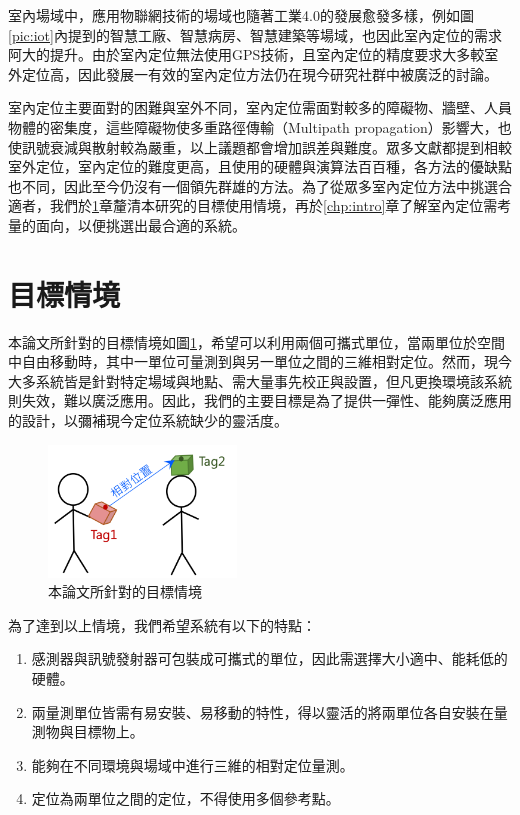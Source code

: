 室內場域中，應用物聯網技術的場域也隨著工業4.0的發展愈發多樣，例如圖\ref{pic:iot}內提到的智慧工廠、智慧病房、智慧建築等場域，也因此室內定位的需求阿大的提升。由於室內定位無法使用GPS技術，且室內定位的精度要求大多較室外定位高，因此發展一有效的室內定位方法仍在現今研究社群中被廣泛的討論\cite{survey_indoor2014}。

室內定位主要面對的困難與室外不同，室內定位需面對較多的障礙物、牆壁、人員物體的密集度，這些障礙物使多重路徑傳輸（Multipath propagation）影響大，也使訊號衰減與散射較為嚴重，以上議題都會增加誤差與難度。眾多文獻都提到相較室外定位，室內定位的難度更高\cite{survey_light2020}\cite{survey_light2018}\cite{survey_indoor2014}\cite{survey_indoor2018}\cite{survey:indoor_wayfinding}，且使用的硬體與演算法百百種，各方法的優缺點也不同，因此至今仍沒有一個領先群雄的方法。為了從眾多室內定位方法中挑選合適者，我們於\ref{chp:motivate}章釐清本研究的目標使用情境，再於\ref{chp:intro}章了解室內定位需考量的面向，以便挑選出最合適的系統。






\section{目標情境}
\label{chp:motivate}

本論文所針對的目標情境如圖\ref{pic:imagine}，希望可以利用兩個可攜式單位，當兩單位於空間中自由移動時，其中一單位可量測到與另一單位之間的三維相對定位。然而，現今大多系統皆是針對特定場域與地點、需大量事先校正與設置，但凡更換環境該系統則失效，難以廣泛應用。因此，我們的主要目標是為了提供一彈性、能夠廣泛應用的設計，以彌補現今定位系統缺少的靈活度。

\begin{figure}[ht]
    \centering
    \includegraphics[width=5cm]{ch1pic/imagine.png}
    \caption{本論文所針對的目標情境}
    \label{pic:imagine}
\end{figure}

為了達到以上情境，我們希望系統有以下的特點：

\begin{enumerate}
    \item 感測器與訊號發射器可包裝成可攜式的單位，因此需選擇大小適中、能耗低的硬體。
    \item 兩量測單位皆需有易安裝、易移動的特性，得以靈活的將兩單位各自安裝在量測物與目標物上。
    \item 能夠在不同環境與場域中進行三維的相對定位量測。
    \item 定位為兩單位之間的定位，不得使用多個參考點。
\end{enumerate}




